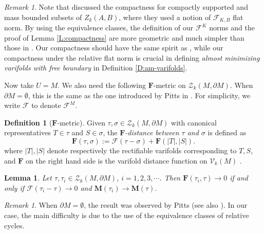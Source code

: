 \documentclass[10pt]{amsart}
\newtheorem{lemma}[theorem]{Lemma}
\theoremstyle{definition}
\newtheorem{definition}[theorem]{Definition}
\theoremstyle{remark}
\newtheorem{remark}[theorem]{Remark}
\numberwithin{equation}{section}
\newcommand{\V}{\mathcal{V}}
\newcommand{\F}{\mathcal{F}}
\newcommand{\si}{\sigma}
\newcommand{\Z}{\mathcal{Z}}
\newcommand{\M}{\mathbf{M}}
\newcommand{\mF}{\mathbf{F}}
\begin{document}
\begin{remark}
Note that \cite[4.4.4]{Federer} discussed the compactness for compactly supported and mass bounded subsets of $Z_k(A, B)$, where they used a notion of $\F_{K, B}$ flat norm. By using the equivalence classes, the definition of our $\F^K$ norms and the proof of Lemma \ref{L:compactness} are more geometric and much simpler than those in \cite[4.4.4]{Federer}. Our compactness should have the same spirit as \cite[4.4.4]{Federer}, while our compactness under the relative flat norm is crucial in defining \emph{almost minimizing varifolds with free boundary} in Definition \ref{D:am-varifolds}.
\end{remark}

Now take $U=M$. We also need the following $\mF$-metric on $\Z_k(M, \partial M)$. When $\partial M=\emptyset$, this is the same as the one introduced by Pitts in \cite[2.1(20)]{Pitts}. For simplicity, we write $\F$ to denote $\F^M$.

\begin{definition}[$\mF$-metric]
\label{D:F-metric}
Given $\tau, \si\in\Z_k(M, \partial M)$ with canonical representatives $T\in \tau$ and $S \in \si$, the \emph{$\mF$-distance between $\tau$ and $\si$} is defined as
\[ \mF(\tau, \si):=\F(\tau-\si)+\mF(|T|, |S|).\]
where $|T|, |S|$ denote respectively the rectifiable varifolds corresponding to $T, S$, and $\mF$ on the right hand side is the varifold distance function on $\V_k(M)$ \cite[2.1(19)]{Pitts}.
\end{definition}


\begin{lemma}
\label{L:F-metric}
Let $\tau, \tau_i \in \Z_k(M, \partial M)$, $i=1,2,3,\cdots$. Then $\mF(\tau_i,\tau) \to 0$ if and only if $\F(\tau_i-\tau) \to 0$ and $\M(\tau_i) \to \M(\tau)$.
\end{lemma}

\begin{remark}
When $\partial M=\emptyset$, the result was observed by Pitts \cite[page 68]{Pitts} (see also \cite[Lemma 4.1]{Marques-Neves14}). In our case, the main difficulty is due to the use of the equivalence classes of relative cycles.
\end{remark}
\end{document}
